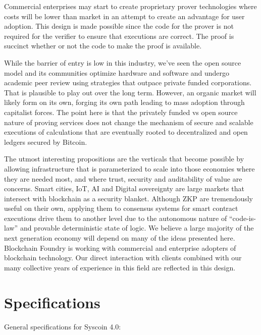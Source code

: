 \documentclass[peerreview]{ieeesyscoin}
\begin{document}
Commercial enterprises may start to create proprietary prover technologies where costs will be lower than market in an attempt to create an advantage for user adoption. This design is made possible since the code for the prover is not required for the verifier to ensure that executions are correct. The proof is succinct whether or not the code to make the proof is available.

While  the barrier of entry is low in this industry, we’ve seen the open source model and its communities optimize hardware and software and undergo academic peer review using strategies  that outpace private funded corporations. That is plausible to play out over the long term. However, an organic market will likely form on its own, forging its own path leading to mass adoption through capitalist forces. The point here is that the privately funded vs open source nature of proving services does not change the mechanism of secure and scalable executions of calculations that are eventually rooted to decentralized and open ledgers secured by Bitcoin.

The utmost interesting propositions are the verticals that become possible by allowing infrastructure that is parameterized to scale into those economies where they are needed most, and where trust, security and auditability of value are concerns. Smart cities, IoT, AI and Digital sovereignty are large markets that intersect with blockchain as a security blanket. Although ZKP are tremendously useful on their own, applying them to consensus systems for smart contract executions drive them to another level due to the autonomous nature of “code-is-law” and provable deterministic state of logic. We believe a large majority of the next generation economy will depend on many of the ideas presented here. Blockchain Foundry is working with commercial and enterprise adopters of blockchain technology. Our direct interaction with clients combined with our many collective years of experience in this field are reflected in this design.


\section{Specifications}
\label{section:specs}


General specifications for Syscoin 4.0:
\end{document}

